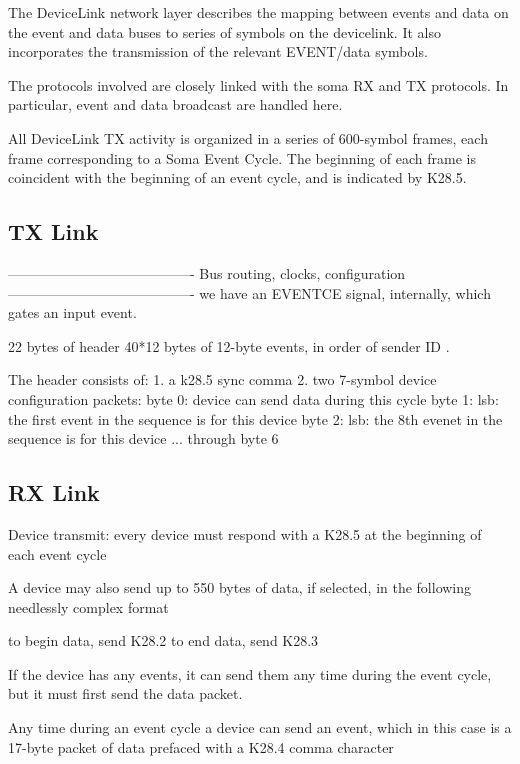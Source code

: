 
The DeviceLink network layer describes the mapping between events and data on the event and data buses to series of symbols on the devicelink. It also incorporates the transmission of the relevant EVENT/data symbols. 

The protocols involved are closely linked with the soma RX and TX protocols. In particular, event and data broadcast are handled here. 


All DeviceLink TX activity is organized in a series of 600-symbol frames, each frame corresponding to a Soma Event Cycle. The beginning of each frame is coincident with the beginning of an event cycle, and is indicated by K28.5. 


\subsection{TX Link} 


----------------------------------------
Bus routing, clocks, configuration
----------------------------------------
we have an EVENTCE signal, internally, which gates an input event. 

22 bytes of header
40*12 bytes of 12-byte events, in order of sender ID .

The header consists of:
1. a k28.5 sync comma
2. two 7-symbol device configuration packets:
byte 0: device can send data during this cycle
byte 1: lsb: the first event in the sequence is for this device
byte 2: lsb: the 8th evenet in the sequence is for this device
... through byte 6


\subsection{RX Link}

Device transmit:
every device must respond with a K28.5 at the beginning of each event cycle

A device may also send up to 550 bytes of data, if selected, in the following needlessly complex format

to begin data, send K28.2
to end data, send K28.3

If the device has any events, it can send them any time during the event cycle, but it must first send the data packet. 


Any time during an event cycle a device can send an event, which in this case is a 17-byte packet of data prefaced with a K28.4 comma character



